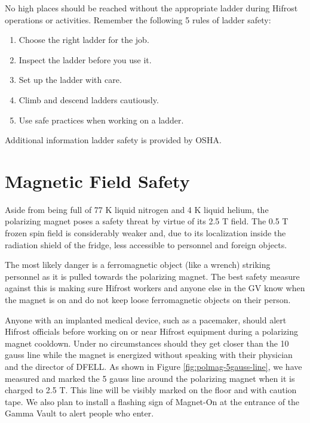 No high places should be reached without the appropriate ladder during Hifrost operations or activities.  Remember the following 5 rules of ladder safety\cite{laddersafety-duke}:
\begin{enumerate}
 \item Choose the right ladder for the job.
 \item Inspect the ladder before you use it.
 \item Set up the ladder with care.
 \item Climb and descend ladders cautiously.
 \item Use safe practices when working on a ladder.
\end{enumerate}

Additional information ladder safety is provided by OSHA\cite{laddersafety-osha}.

\section{Magnetic Field Safety}

Aside from being full of 77 K liquid nitrogen and 4 K liquid helium, the polarizing magnet poses a safety threat by virtue of its 2.5 T field.  The 0.5 T frozen spin field is considerably weaker and, due to its localization inside the radiation shield of the fridge, less accessible to personnel and foreign objects.

The most likely danger is a ferromagnetic object (like a wrench) striking personnel as it is pulled towards the polarizing magnet\cite{magnetsafety}.  The best safety measure against this is making sure Hifrost workers and anyone else in the GV know when the magnet is on and do not keep loose ferromagnetic objects on their person.

Anyone with an implanted medical device, such as a pacemaker, should alert Hifrost officials before working on or near Hifrost equipment during a polarizing magnet cooldown.  Under no circumstances should they get closer than the 10 gauss line while the magnet is energized without speaking with their physician and the director of DFELL\cite{pacemakersafety}.  As shown in Figure \ref{fig:polmag-5gauss-line}, we have measured and marked the 5 gauss line around the polarizing magnet when it is charged to 2.5 T.  This line will be visibly marked on the floor and with caution tape.  We also plan to install a flashing sign of Magnet-On at the entrance of the Gamma Vault to alert people who enter.

